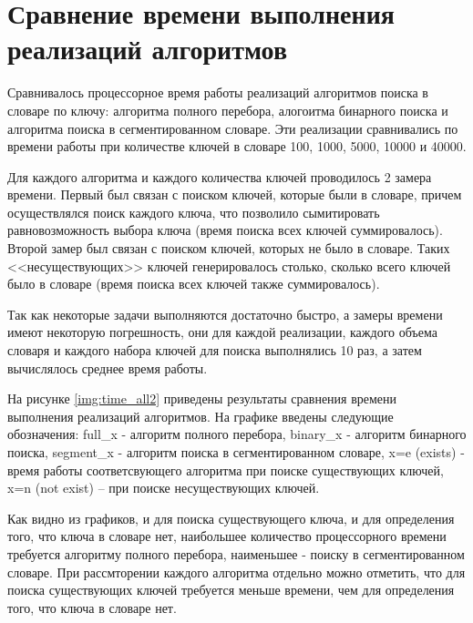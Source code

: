 
\section{Сравнение времени выполнения реализаций алгоритмов}

Сравнивалось процессорное время работы реализаций алгоритмов поиска в словаре по ключу: алгоритма полного перебора, алогоитма бинарного поиска и алгоритма поиска в сегментированном словаре. Эти реализации сравнивались по времени работы при количестве ключей в словаре 100, 1000, 5000, 10000 и 40000.

Для каждого алгоритма и каждого количества ключей проводилось 2 замера времени. Первый был связан с поиском ключей, которые были в словаре, причем осуществлялся поиск каждого ключа, что позволило сымитировать равновозможность выбора ключа (время поиска всех ключей суммировалось). Второй замер был связан с поиском ключей, которых не было в словаре. Таких <<несуществующих>> ключей генерировалось столько, сколько всего ключей было в словаре (время поиска всех ключей также суммировалось).
 
Так как некоторые задачи выполняются достаточно быстро, а замеры времени имеют некоторую погрешность, они для каждой реализации, каждого объема словаря и каждого набора ключей для поиска выполнялись 10 раз, а затем вычислялось среднее время работы.
 

На рисунке \ref{img:time_all2} приведены результаты сравнения времени выполнения реализаций алгоритмов. На графике введены следующие обозначения: full\_x - алгоритм полного перебора, binary\_x - алгоритм бинарного поиска, segment\_x - алгоритм поиска в сегментированном словаре, x=e (exists) - время работы соответсвующего алгоритма при поиске существующих ключей, x=n (not exist) -- при поиске несуществующих ключей.

\clearpage
{}

Как видно из графиков, и для поиска существующего ключа, и для определения того, что ключа в словаре нет, наибольшее количество процессорного времени требуется алгоритму полного перебора, наименьшее - поиску в сегментированном словаре. При рассмторении каждого алгоритма отдельно можно отметить, что для поиска существующих ключей требуется меньше времени, чем для определения того, что ключа в словаре нет.


